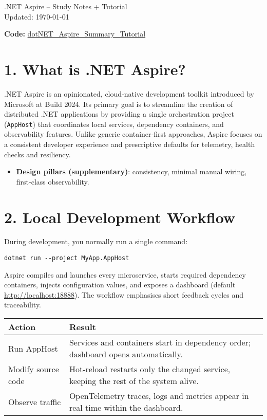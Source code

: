 \documentclass[table]{article}
\begin{document}
\begin{center}
  {\LARGE\color{pblue}\faCubes\enspace .NET Aspire – Study Notes + Tutorial}\\[2pt]
  {\footnotesize Updated: \today} \par
  {\small \textbf{Code:} \href{https://github.com/konradcinkusz/dotNET_Aspire_Summary_Tutorial} \faGithub\;\underline{dotNET\_Aspire\_Summary\_Tutorial}}
\end{center}
\vspace{1em}

\section*{1. \faLightbulb\enspace What is .NET Aspire?}
.NET Aspire is an opinionated, cloud‑native development toolkit introduced by Microsoft at Build 2024.  
Its primary goal is to streamline the creation of distributed .NET applications by providing a single orchestration project (\texttt{AppHost}) that coordinates local services, dependency containers, and observability features.  Unlike generic container‑first approaches, Aspire focuses on a consistent developer experience and prescriptive defaults for telemetry, health checks and resiliency.

\begin{itemize}
  \item \textbf{Design pillars (supplementary)}: consistency, minimal manual wiring, first‑class observability.
\end{itemize}

\section*{2. \faLaptopCode\enspace Local Development Workflow}
During development, you normally run a single command:
\begin{verbatim}
dotnet run --project MyApp.AppHost
\end{verbatim}
\noindent Aspire compiles and launches every microservice, starts required dependency containers, injects configuration values, and exposes a dashboard (default \url{http://localhost:18888}).  The workflow emphasises short feedback cycles and traceability.

\begin{tabularx}{\linewidth}{@{}>{\raggedright\arraybackslash}X>{\raggedright\arraybackslash}X@{}}
\toprule
Action & Result \\\midrule
Run AppHost & Services and containers start in dependency order; dashboard opens automatically.\\
Modify source code & Hot‑reload restarts only the changed service, keeping the rest of the system alive.\\
Observe traffic & OpenTelemetry traces, logs and metrics appear in real time within the dashboard.\\
\bottomrule
\end{tabularx}
\end{document}
